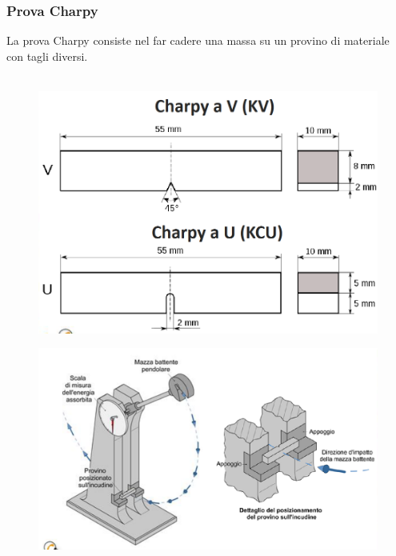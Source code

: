 \documentclass{article}
\begin{document}
{                \subsubsection{Prova Charpy}
                    La prova Charpy consiste nel far cadere una massa su un provino di materiale con tagli diversi.\\ \\
                    \newpage
                    \begin{figure}[!h]
                        \centering
                        \includegraphics[width=.85\linewidth]{Diagramma per le Prove Charpy.png}
                    \end{figure}
                    \begin{figure}[!h]
                        \centering
                        \includegraphics[width=.85\linewidth]{Diagramma per il metodo di Prova Charpy.png}
                    \end{figure}
                    \begin{figure}[!h]
                        \centering

\end{figure}}
\end{document}

